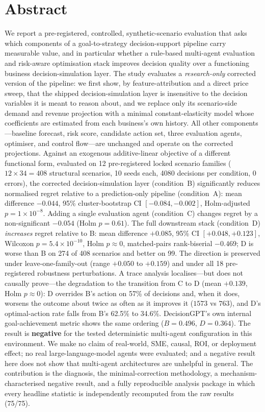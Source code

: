 \documentclass[10pt,twocolumn,a4paper]{article}
\begin{document}
\section*{Abstract}
\noindent We report a pre-registered, controlled, synthetic-scenario evaluation that asks
which components of a goal-to-strategy decision-support pipeline carry
measurable value, and in particular whether a rule-based multi-agent evaluation
and risk-aware optimisation stack improves decision quality over a functioning
business decision-simulation layer. The study evaluates a \emph{research-only}
corrected version of the pipeline: we first show, by feature-attribution and a
direct price sweep, that the shipped decision-simulation layer is insensitive to
the decision variables it is meant to reason about, and we replace only its
scenario-side demand and revenue projection with a minimal constant-elasticity
model whose coefficients are estimated from each business's own history. All
other components---baseline forecast, risk score, candidate action set, three
evaluation agents, optimiser, and control flow---are unchanged and operate on
the corrected projections. Against an exogenous additive-linear objective of a
different functional form, evaluated on 12 pre-registered locked scenario
families ($12\times34 = 408$ structural scenarios, 10 seeds each, 4080 decisions
per condition, 0 errors), the corrected decision-simulation layer (condition~B)
significantly reduces normalised regret relative to a prediction-only pipeline
(condition~A):
mean difference $-0.044$, 95\% cluster-bootstrap CI $[-0.084,-0.002]$,
Holm-adjusted $p=1\times10^{-8}$. Adding a single evaluation agent (condition~C)
changes regret by a non-significant $-0.054$ (Holm $p=0.61$). The full
downstream stack (condition~D) \emph{increases} regret relative to B: mean
difference $+0.085$, 95\% CI $[+0.048,+0.123]$, Wilcoxon $p=5.4\times10^{-10}$,
Holm $p\approx0$, matched-pairs rank-biserial $-0.469$; D is worse than B on
274 of 408 scenarios and better on 99. The direction is preserved under
leave-one-family-out (range $+0.050$ to $+0.159$) and under all 18
pre-registered robustness perturbations. A trace analysis localises---but does
not causally prove---the degradation to the transition from C to D
(mean $+0.139$, Holm $p\approx0$): D overrides B's action on 57\% of decisions
and, when it does, worsens the outcome about twice as often as it improves it
($1573$ vs $763$), and D's optimal-action rate falls from B's 62.5\% to 34.6\%.
DecisionGPT's own internal goal-achievement metric shows the same ordering
($B=0.496$, $D=0.364$). The result is \textbf{negative} for the tested
deterministic multi-agent configuration in this environment. We make no claim of
real-world, SME, causal, ROI, or deployment effect; no real large-language-model
agents were evaluated; and a negative result here does not show that multi-agent
architectures are unhelpful in general. The contribution is the diagnosis, the
minimal-correction methodology, a mechanism-characterised negative result, and a
fully reproducible analysis package in which every headline statistic is
independently recomputed from the raw results (75/75).
\end{document}
